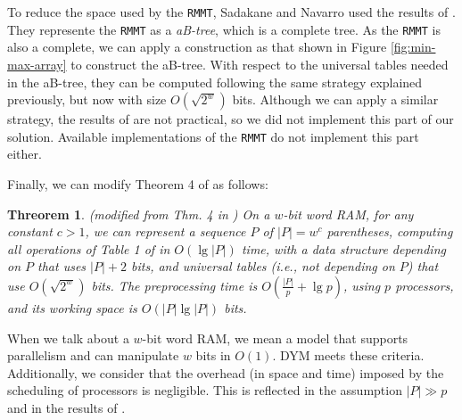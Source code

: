To reduce the space used by the {\tt RMMT}, Sadakane and Nava\-rro used
the results of \cite{Patrascu:2008:SUC:1470582.1470670}. They
represente the {\tt RMMT} as a \emph{aB-tree}, which is a complete
tree. As the {\tt RMMT} is also a complete, we can apply a
construction as that shown in Figure \ref{fig:min-max-array} to
construct the aB-tree. With respect to the universal tables needed in
the aB-tree, they can be computed following the same strategy
explained previously, but now with size $O(\sqrt{2^{w}})$
bits. Although we can apply a similar strategy, the results of
\cite{Patrascu:2008:SUC:1470582.1470670} are not practical, so we did
not implement this part of our solution. Available implementations of
the {\tt RMMT} do not implement this part either.

Finally, we can modify Theorem 4 of
\cite{Navarro:2014:FFS:2620785.2601073} as follows:

\newtheorem{theorem}{Threorem}
\begin{theorem}
  {\sc (modified from Thm. 4 in
    \cite{Navarro:2014:FFS:2620785.2601073})} On a $w$-bit word RAM,
  for any constant $c>1$, we can represent a sequence $P$ of
  $|P|=w^{c}$ parentheses, computing all operations of Table 1
  of \cite{Navarro:2014:FFS:2620785.2601073} in $O(\lg |P|)$ time, with a data
  structure depending on $P$ that uses $|P|+2$ bits, and universal
  tables (i.e., not depending on $P$) that use $O(\sqrt{2^{w}})$
  bits. The preprocessing time is $O(\frac{|P|}{p} + \lg p)$, using $p$
  processors, and its working space is $O(|P|\lg |P|)$ bits.
\end{theorem}
			
				
When we talk about a $w$-bit word RAM, we mean a model that supports
parallelism and can manipulate $w$ bits in $O(1)$. DYM meets these
criteria. Additionally, we consider that the overhead (in space and
time) imposed by the scheduling of processors is negligible. This is
reflected in the assumption $ |P|\gg p$ and in the results of
\cite{Blumofe:1999:SMC:324133.324234}.

